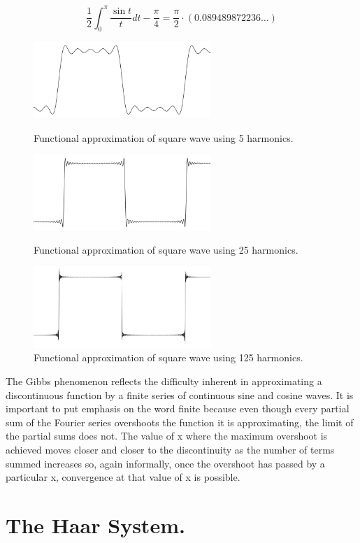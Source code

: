 \[ \frac{1}{2} \int_{0}^{\pi} \frac{\sin t}{t} d t-\frac{\pi}{4}=\frac{\pi}{2} \cdot(0.089489872236 \dots) \]

\begin{figure}[h]
    \centering
    \includegraphics[width=0.6\textwidth]{Gibbs1.PNG}
    \caption{Functional approximation of square wave using 5 harmonics.}
    \includegraphics[width=0.6\textwidth]{Gibbs2.PNG}
    \caption{Functional approximation of square wave using 25 harmonics.}
    \includegraphics[width=0.6\textwidth]{Gibbs3.PNG}
    \caption{Functional approximation of square wave using 125 harmonics.}
    \label{fig:Gibbs}
\end{figure}

\par

The Gibbs phenomenon reflects the difficulty inherent in approximating a discontinuous function by a finite series of continuous sine and cosine waves. It is important to put emphasis on the word finite because even though every partial sum of the Fourier series overshoots the function it is approximating, the limit of the partial sums does not. The value of x where the maximum overshoot is achieved moves closer and closer to the discontinuity as the number of terms summed increases so, again informally, once the overshoot has passed by a particular x, convergence at that value of x is possible.


\section{The Haar System.}
\label{sec3}

